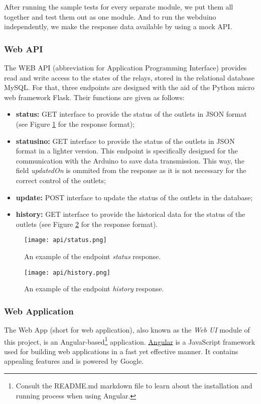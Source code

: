 After running the sample tests for every separate module, we put them all together and test them out as one module. And to run the webduino independently, we make the response data available by using a mock API.

\subsubsection{Web API}

The WEB API (abbreviation for Application Programming Interface) provides read
and write access to the states of the relays, stored in the relational
database MySQL. For that, three endpoints are designed with the aid of the
Python micro web framework Flask. Their functions are given as follows:

\begin{itemize}
    \item \textbf{status:} GET interface to provide the status of the outlets in
    JSON format (see Figure \ref{fig:api-status} for the response format);
    \item \textbf{statusino:} GET interface to provide the status of the outlets
    in JSON format in a lighter version. This endpoint is specifically designed
    for the communication with the Arduino to save data transmission.
    This way, the field \textit{updatedOn} is ommited from the response as it is
    not necessary for the correct control of the outlets;
    \item \textbf{update:} POST interface to update the status of the outlets in
    the database;
    \item \textbf{history:} GET interface to provide the historical data for the
    status of the outlets (see Figure \ref{fig:api-history} for the response format).
\end{itemize}

\begin{figure}[h!]
    \centering
    \texttt{[image: api/status.png]}
    \caption{An example of the endpoint \textit{status} response.}
    \label{fig:api-status}
\end{figure}

\begin{figure}[h!]
    \centering
    \texttt{[image: api/history.png]}
    \caption{An example of the endpoint \textit{history} response.}
    \label{fig:api-history}
\end{figure}

\subsubsection{Web Application}
The Web App (short for web application), also known as the \emph{Web UI} module
of this project, is an Angular-based\footnote{Consult the README.md markdown
file to learn about the installation and running process when using Angular.}
application. \href{https://angular.io}{Angular} is a JavaScript framework used
for building web applications in a fast yet effective manner. It contains
appealing features and is powered by Google.

